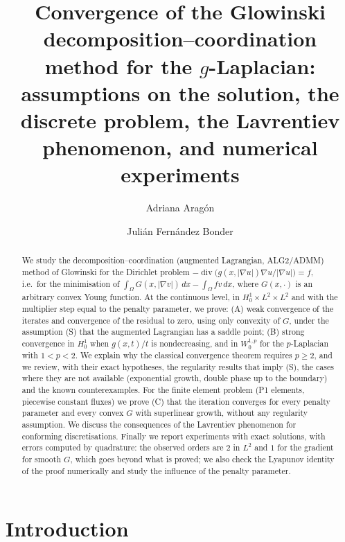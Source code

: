 \documentclass[11pt]{amsart}
\title[Glowinski's method for the $g$-Laplacian]{Convergence of the Glowinski decomposition--coordination method for the $g$-Laplacian: assumptions on the solution, the discrete problem, the Lavrentiev phenomenon, and numerical experiments}
\author{Adriana Arag\'on}
\author{Juli\'an Fern\'andez Bonder}
\theoremstyle{definition}
\theoremstyle{remark}
\numberwithin{equation}{section}
\newcommand{\dx}{\,dx}
\newcommand{\abs}[1]{\lvert #1\rvert}
\DeclareMathOperator{\divg}{div}
\begin{document}
\begin{abstract}
We study the decomposition--coordination (augmented Lagrangian, ALG2/ADMM) method of Glowinski for the Dirichlet problem $-\divg\big(g(x,\abs{\nabla u})\nabla u/\abs{\nabla u}\big)=f$, i.e.\ for the minimisation of $\int_\Omega G(x,\abs{\nabla v})\dx-\int_\Omega fv\dx$, where $G(x,\cdot)$ is an arbitrary convex Young function. At the continuous level, in $H^1_0\times L^2\times L^2$ and with the multiplier step equal to the penalty parameter, we prove: (A) weak convergence of the iterates and convergence of the residual to zero, using only convexity of $G$, under the assumption (S) that the augmented Lagrangian has a saddle point; (B) strong convergence in $H^1_0$ when $g(x,t)/t$ is nondecreasing, and in $W^{1,p}_0$ for the $p$-Laplacian with $1<p<2$. We explain why the classical convergence theorem requires $p\ge2$, and we review, with their exact hypotheses, the regularity results that imply (S), the cases where they are not available (exponential growth, double phase up to the boundary) and the known counterexamples. For the finite element problem (P1 elements, piecewise constant fluxes) we prove (C) that the iteration converges for every penalty parameter and every convex $G$ with superlinear growth, without any regularity assumption. We discuss the consequences of the Lavrentiev phenomenon for conforming discretisations. Finally we report experiments with exact solutions, with errors computed by quadrature: the observed orders are $2$ in $L^2$ and $1$ for the gradient for smooth $G$, which goes beyond what is proved; we also check the Lyapunov identity of the proof numerically and study the influence of the penalty parameter.
\end{abstract}

\maketitle

\tableofcontents

\section{Introduction}\label{sec:intro}
\end{document}
